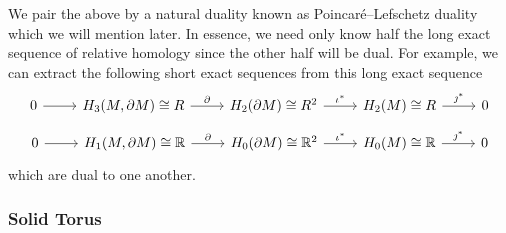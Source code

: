 \documentclass{article}
\begin{document}
We pair the above by a natural duality known as Poincar\'e--Lefschetz duality which we will mention later. In essence, we need only know half the long exact sequence of relative homology since the other half will be dual. For example, we can extract the following short exact sequences from this long exact sequence
\[
\begin{tikzcd}
0 \arrow[r] & {H_3(M,\partial M)\cong R} \arrow[r, "\partial"] & H_2(\partial M)\cong R^2 \arrow[r, "\iota^*"] & H_2(M)\cong R \arrow[r, "\jmath^*"] & 0
\end{tikzcd}
\]
\[
\begin{tikzcd}
0 \arrow[r] & {H_1(M,\partial M)\cong \mathbb{R}} \arrow[r, "\partial"] & H_0(\partial M)\cong \mathbb{R}^2 \arrow[r, "\iota^*"] & H_0(M)\cong \mathbb{R} \arrow[r, "\jmath^*"] & 0
\end{tikzcd}
\]
which are dual to one another. 


\subsubsection{Solid Torus}
\end{document}
